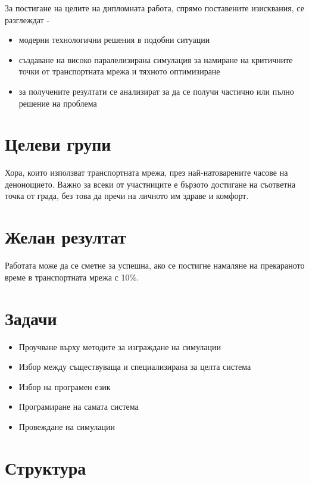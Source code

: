 		За постигане на целите на дипломната работа, спрямо поставените изисквания, се разглеждат - 
	
		\begin{itemize}
			\item модерни технологични решения в подобни ситуации
			\item създаване на високо паралелизирана симулация за намиране на критичните точки от транспортната мрежа и тяхното оптимизиране
			\item за получените резултати се анализират за да се получи частично или пълно решение на проблема
		\end{itemize}

	\section{Целеви групи}
	
		Хора, които използват транспортната мрежа, през най-натоварените часове на денонощието. Важно за всеки от участниците е бързото достигане на съответна точка от града, без това да пречи на личното им здраве и комфорт.
	
	\section{Желан резултат}
	
		Работата може да се сметне за успешна, ако се постигне намаляне на прекараното време в транспортната мрежа с 10\%.
	
	\section{Задачи}
	
		\begin{itemize}
			\item Проучване върху методите за изграждане на симулации
			\item Избор между съществуваща и специализирана за целта система
			\item Избор на програмен език
			\item Програмиране на самата система
			\item Провеждане на симулации
		\end{itemize}
	
	\section{Структура}
	
